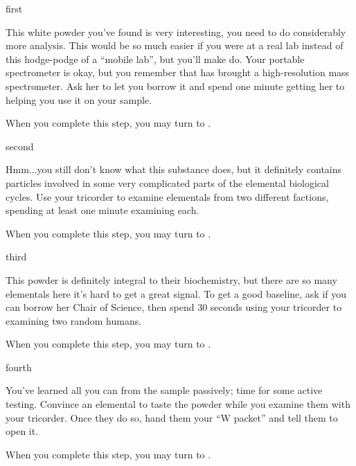 \documentclass[notebook]{elementals}
\begin{document}

\startnotebook{\nWhiteResearch{}}

\begin{page}{first}

This white powder you've found is very interesting, you need to do considerably more analysis. This would be so much easier if you were at a real lab instead of this hodge-podge of a ``mobile lab'', but you'll make do. Your portable spectrometer is okay, but you remember that \cGD{} has brought a high-resolution mass spectrometer. Ask her to let you borrow it and spend one minute getting her to helping you use it on your sample.

When you complete this step, you may turn to .

\end{page}

\begin{page}{second}

Hmm...you still don't know what this substance does, but it definitely contains particles involved in some very complicated parts of the elemental biological cycles. Use your tricorder to examine elementals from two different factions, spending at least one minute examining each.

When you complete this step, you may turn to .

\end{page}

\begin{page}{third}

This powder is definitely integral to their biochemistry, but there are so many elementals here it's hard to get a great signal. To get a good baseline, ask \cGD{} if you can borrow her Chair of Science, then spend 30 seconds using your tricorder to examining two random humans.

When you complete this step, you may turn to .

\end{page}

\begin{page}{fourth}

You've learned all you can from the sample passively; time for some active testing. Convince an elemental to taste the powder while you examine them with your tricorder. Once they do so, hand them your ``W packet'' and tell them to open it.

When you complete this step, you may turn to .

\end{page}
\end{document}
